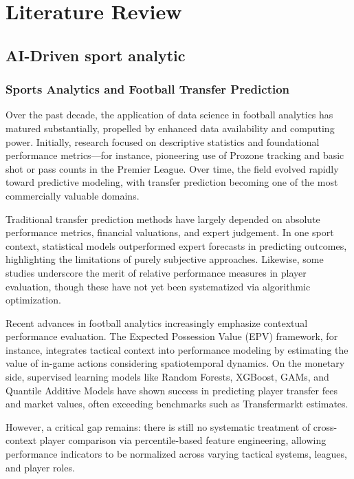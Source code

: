 \section{Literature Review}

\subsection{AI-Driven sport analytic}

\subsubsection{Sports Analytics and Football Transfer Prediction}

Over the past decade, the application of data science in football analytics has matured substantially, propelled by enhanced data availability and computing power. Initially, research focused on descriptive statistics and foundational performance metrics—for instance, pioneering use of Prozone tracking and basic shot or pass counts in the Premier League. Over time, the field evolved rapidly toward predictive modeling, with transfer prediction becoming one of the most commercially valuable domains.

Traditional transfer prediction methods have largely depended on absolute performance metrics, financial valuations, and expert judgement. In one sport context, statistical models outperformed expert forecasts in predicting outcomes, highlighting the limitations of purely subjective approaches\citep{vanarem2025forecastingfuturedevelopmentquality}. Likewise, some studies underscore the merit of relative performance measures in player evaluation, though these have not yet been systematized via algorithmic optimization.

Recent advances in football analytics increasingly emphasize contextual performance evaluation. The Expected Possession Value (EPV) framework, for instance, integrates tactical context into performance modeling by estimating the value of in-game actions considering spatiotemporal dynamics\citep{fernandez2021framework}. On the monetary side, supervised learning models like Random Forests, XGBoost, GAMs, and Quantile Additive Models have shown success in predicting player transfer fees and market values, often exceeding benchmarks such as Transfermarkt estimates.

However, a critical gap remains: there is still no systematic treatment of cross-context player comparison via percentile-based feature engineering, allowing performance indicators to be normalized across varying tactical systems, leagues, and player roles.

